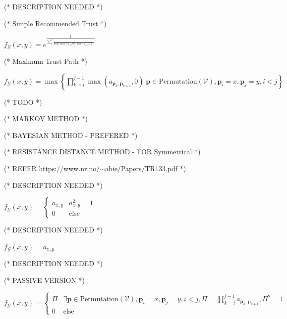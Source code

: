 \documentclass{article}
\begin{document}
(* DESCRIPTION NEEDED *)



(* Simple Recommended Trust *)

\(f_{\mathcal{G}}(x,y)=e^{\frac{1}{\sum _i^{\mathcal{V}} \frac{1}{\text{Log}\left[\max \left(a_{i,y},0\right) \max \left(a_{x,i},0\right)\right]}}}\)



(* Maximum Trust Path *)

\(f_{\mathcal{G}}(x,y)=\max \left\{\left.\prod _{k=i}^{j-1} \max \left(a_{\pmb{p}_k,\pmb{p}_{k+1}},0\right)\right|\pmb{p}\in \text{Permutation}(\mathcal{V}),\pmb{p}_i=x,\pmb{p}_j=y,i<j\right\}\)



(* TODO *)



(* MARKOV METHOD *)



(* BAYESIAN METHOD - PREFERED *)



(* RESISTANCE DISTANCE METHOD - FOR Symmetrical *)



(* REFER https://www.nr.no/$\sim $abie/Papers/TR133.pdf *)





(* DESCRIPTION NEEDED *)

\(f_{\mathcal{G}}(x,y)=\begin{cases}
 a_{x,y} & a_{x,y}^2=1 \\
 0 & \text{else}
\end{cases}\)





(* DESCRIPTION NEEDED *)

\(f_{\mathcal{G}}(x,y)=a_{x,y}\)





(* DESCRIPTION NEEDED *)



(* PASSIVE VERSION *)

\(f_{\mathcal{G}}(x,y)=\begin{cases}
 \Pi  & \exists \pmb{p}\in \text{Permutation}(\mathcal{V}),\pmb{p}_i=x,\pmb{p}_j=y,i<j,\Pi =\prod _{k=i}^{j-1} a_{\pmb{p}_k,\pmb{p}_{k+1}},\Pi ^2=1
\\
 0 & \text{else}
\end{cases}\)
\end{document}
